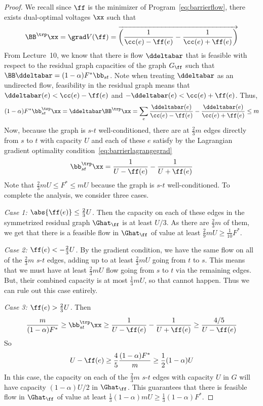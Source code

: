 \begin{proof}
  We recall since $\ff$ is the minimizer of
  Program~\eqref{eq:barrierflow}, there exists dual-optimal voltages
  $\xx$ such that
  \[
    \BB^{\trp} \xx = \grad V(\ff) =
    \cvec{\frac{1}
    {\cc(e)-\ff(e)}
    -
    \frac{1}
    {\cc(e)+\ff(e)}}
  \]
From Lecture~10, we know that there is flow $\ddeltabar$ that is feasible with
respect to the residual graph capacities of the graph $G_{\ff}$ such
that $\BB \ddeltabar = (1-\alpha)F^* \bb_{st}$.
Note when treating $\ddeltabar$ as an undirected
flow, feasibility in the residual graph means that $\ddeltabar(e) < \cc(e)-\ff(e)$
and $-\ddeltabar(e) < \cc(e)+\ff(e)$.
Thus,
\[
  (1-\alpha)F^* \bb_{st}^{\trp}
  \xx
  =
  \ddeltabar 
  \BB^{\trp} \xx
  =
  \sum_e
  \frac{\ddeltabar(e)}
    {\cc(e)-\ff(e)}
    -
    \frac{\ddeltabar(e)}
    {\cc(e)+\ff(e)}
    \leq
    m
  \]
  Now, because the graph is $s$-$t$ well-conditioned,
  there are at $\frac{2}{3} m $ edges directly from $s$ to $t$ with capacity $U$
  and each of these $e$
 satisfy by the Lagrangian gradient optimality condition~\eqref{eq:barrierlagrangegrad}
 \[
   \bb_{st}^{\trp}
  \xx
   =
  \frac{1}
    {U-\ff(e)}
    -
    \frac{1}
    {U+\ff(e)}
  \]
Note that $\frac{2}{3} mU \leq F^* \leq mU$ because the graph is $s$-$t$
well-conditioned.
To complete the analysis, we consider three cases.

\emph{Case 1: $\abs{\ff(e)} \leq \frac{2}{3} U$.}
Then the capacity on each of these edges in the symmetrized residual
graph $\Ghat_{\ff}$ is at least $U/3$.
As there are $\frac{2}{3} m $ of them,
we get that there is a feasible flow in $\Ghat_{\ff}$ of value at least
$\frac{2}{9} mU\geq \frac{1}{10} F^*$. 

\emph{Case 2: $\ff(e) < -\frac{2}{3} U$.}
By the gradient condition, we have the same flow on all of the $\frac{2}{3} m$
$s$-$t$ edges, adding  up to at least $\frac{2}{3} mU$ going from $t$ to $s$.
This means that we must have at least $\frac{2}{3} mU$ flow going from
$s$ to $t$ via the remaining edges. But, their combined capacity is at
most $\frac{1}{3} mU$, so that cannot happen. Thus we can rule out
this case entirely.

\emph{Case 3: $\ff(e) > \frac{2}{3} U$.}
Then 
\[
  \frac{m}{(1-\alpha)F^* }
  \geq
     \bb_{st}^{\trp}
     \xx
 \geq
  \frac{1}
    {U-\ff(e)}
    -
    \frac{1}
    {U+\ff(e)}
 \geq
   \frac{4/5}
    {U-\ff(e)}
  \]
So
\[
  U-\ff(e) \geq \frac{4}{5}  \frac{(1-\alpha)F^* }{m}
  \geq \frac{1}{2}
(1-\alpha) U
\]
In this case, the capacity on each of the $\frac{2}{3} m$ 
$s$-$t$ edges with capacity $U$ in $G$ will
have capacity $(1-\alpha) U/2$ in $\Ghat_{\ff}$.
This guarantees that there is feasible flow in $\Ghat_{\ff}$ of value
at least $\frac{1}{3} (1-\alpha) mU \geq \frac{1}{3} (1-\alpha) F^*$.
\end{proof}

